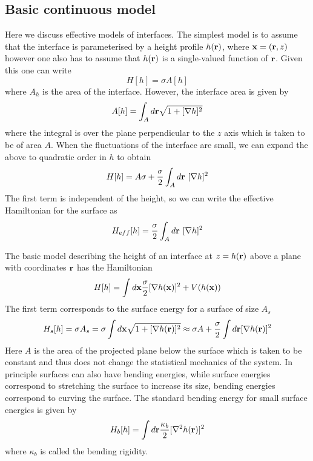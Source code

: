 \subsection{Basic continuous model}

Here we discuss effective models of interfaces. The simplest model is to assume that the 
interface is parameterised by a height profile $h({\bf r})$, where ${\bf x} = ({\bf r},z)$ however one also has to assume that 
$h({\bf r})$ is a single-valued function of ${\bf r}$. Given this one can write
\begin{equation}
H[h] = \sigma A[h]
\end{equation}
where $A_h$ is the area of the interface. However, the interface area is given by
\begin{equation}
A[h] = \int_A d{\bf r}\sqrt{1+[\nabla h]^2}
\end{equation}
where the integral is over the plane perpendicular to the $z$ axis which is taken to be of area $A$. When the fluctuations of the interface are small, we can expand the above to quadratic order in $h$ to obtain
\begin{equation}
H[h]= A\sigma +\frac{\sigma}{2} \int_A d{\bf r} \ [\nabla h]^2
\end{equation}
The first term is independent of the height, so we can write the effective Hamiltonian for the surface as
\begin{equation}
H_{eff} [h]= \frac{\sigma}{2} \int_A d\br\ [\nabla h]^2
\label{heff}
\end{equation}

The basic model describing the height of an interface at $z=h({\bf r})$ above a plane with coordinates ${\bf r}$ has the Hamiltonian 
\begin{equation}
H[h] = \int d{\bf x}\frac{\sigma}{2} [\nabla h({\bf x})]^2 + V(h({\bf x}))
\end{equation}
The first term corresponds to the surface energy for a surface of size $A_s$ 
\begin{equation}
H_s[h] = \sigma A_s =\sigma\int d{\bf x} \sqrt{1+[\nabla h({\bf r})]^2}\approx \sigma A + \frac{\sigma}{2}\int d{\bf r} [\nabla h({\bf r})]^2 
\end{equation}
Here $A$ is the area of the projected plane below the surface which is taken to be constant and thus does not change the statistical mechanics of the system. In principle surfaces can also have bending energies, while surface energies correspond to stretching the surface to increase its size, bending energies correspond to curving the surface. The standard bending energy for small surface energies \cite{diehl_interface_1980} is given by
\begin{equation}
H_b[h] = \int d{\bf r} \frac{\kappa_b}{2}[\nabla^2 h({\bf r})]^2
\end{equation} 
where $\kappa_b$ is called the bending rigidity.

